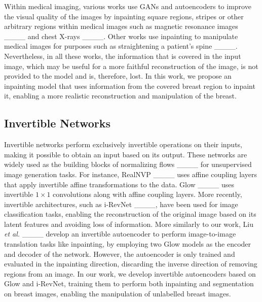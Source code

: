 Within medical imaging, various works use GANs and autoencoders to improve the visual quality of the images by inpainting square regions, stripes or other arbitrary regions within medical images such as magnetic resonance images ____ and chest X-rays ____. Other works use inpainting to manipulate medical images for purposes such as straightening a patient's spine ____. Nevertheless, in all these works, the information that is covered in the input image, which may be useful for a more faithful reconstruction of the image, is not provided to the model and is, therefore, lost. In this work, we propose an inpainting model that uses information from the covered breast region to inpaint it, enabling a more realistic reconstruction and manipulation of the breast. 

\subsection{Invertible Networks}

Invertible networks perform exclusively invertible operations on their inputs, making it possible to obtain an input based on its output. These networks are widely used as the building blocks of normalizing flows ____ for unsupervised image generation tasks. For instance, RealNVP ____ uses affine coupling layers that apply invertible affine transformations to the data. Glow ____ uses invertible $1\times 1$ convolutions along with affine coupling layers. More recently, invertible architectures, such as i-RevNet ____, have been used for image classification tasks, enabling the reconstruction of the original image based on its latent features and avoiding loss of information. 
More similarly to our work, Liu \textit{et al.} ____ develop an invertible autoencoder to perform image-to-image translation tasks like inpainting, by employing two Glow models as the encoder and decoder of the network. However, the autoencoder is only trained and evaluated in the inpainting direction, discarding the inverse direction of removing regions from an image. In our work, we develop invertible autoencoders based on Glow and i-RevNet, training them to perform both inpainting and segmentation on breast images, enabling the manipulation of unlabelled breast images.